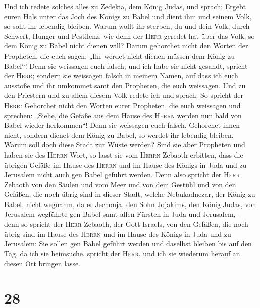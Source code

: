  Und ich redete solches alles zu Zedekia, dem König
Judas, und sprach: Ergebt euren Hals unter das Joch des Königs zu Babel
und dient ihm und seinem Volk, so sollt ihr lebendig bleiben.
 Warum wollt ihr sterben, du und dein Volk, durch
Schwert, Hunger und Pestilenz, wie denn der \textsc{Herr} geredet hat
über das Volk, so dem König zu Babel nicht dienen will? 
Darum gehorchet nicht den Worten der Propheten, die euch sagen: „Ihr
werdet nicht dienen müssen dem König zu Babel``! Denn sie weissagen euch
falsch,  und ich habe sie nicht gesandt, spricht der
\textsc{Herr}; sondern sie weissagen falsch in meinem Namen, auf dass
ich euch ausstoße und ihr umkommet samt den Propheten, die euch
weissagen.  Und zu den Priestern und zu allem diesem Volk
redete ich und sprach: So spricht der \textsc{Herr}: Gehorchet nicht den
Worten eurer Propheten, die euch weissagen und sprechen: „Siehe, die
Gefäße aus dem Hause des \textsc{Herrn} werden nun bald von Babel wieder
herkommen``! Denn sie weissagen euch falsch.  Gehorchet
ihnen nicht, sondern dienet dem König zu Babel, so werdet ihr lebendig
bleiben. Warum soll doch diese Stadt zur Wüste werden? 
Sind sie aber Propheten und haben sie des \textsc{Herrn} Wort, so lasst
sie vom \textsc{Herrn} Zebaoth erbitten, dass die übrigen Gefäße im
Hause des \textsc{Herrn} und im Hause des Königs in Juda und zu
Jerusalem nicht auch gen Babel geführt werden.  Denn also
spricht der \textsc{Herr} Zebaoth von den Säulen und vom Meer und von
dem Gestühl und von den Gefäßen, die noch übrig sind in dieser Stadt,
 welche Nebukadnezar, der König zu Babel, nicht wegnahm,
da er Jechonja, den Sohn Jojakims, den König Judas, von Jerusalem
wegführte gen Babel samt allen Fürsten in Juda und Jerusalem,
 -- denn so spricht der \textsc{Herr} Zebaoth, der Gott
Israels, von den Gefäßen, die noch übrig sind im Hause des
\textsc{Herrn} und im Hause des Königs in Juda und zu Jerusalem:
 Sie sollen gen Babel geführt werden und daselbst bleiben
bis auf den Tag, da ich sie heimsuche, spricht der \textsc{Herr}, und
ich sie wiederum herauf an diesen Ort bringen lasse.

\hypertarget{section-27}{%
\section{28}\label{section-27}}

